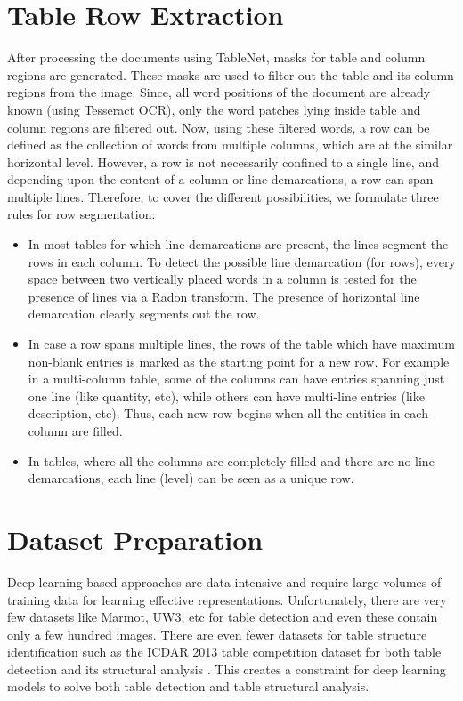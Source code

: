 \documentclass[conference]{IEEEtran}
\begin{document}
\section{Table Row Extraction}
\label{sec:Extraction}
After processing the documents using TableNet, masks for table and column regions are generated. These masks are used to filter out the table and its column regions from the image. Since, all word positions of the document are already known (using Tesseract OCR), only the word patches lying inside table and column regions are filtered out. Now, using these filtered words, a row can be defined as the collection of words from multiple columns, which are at the similar horizontal level. However, a row is not necessarily confined to a single line, and depending upon the content of a column or line demarcations, a row can span multiple lines. Therefore, to cover the different possibilities, we formulate three rules for row segmentation:
\begin{itemize}
\item In most tables for which line demarcations are present, the lines segment the rows in each column. To detect the possible line demarcation (for rows), every space between two vertically placed words in a column is tested for the presence of lines via a Radon transform. The presence of horizontal line demarcation clearly segments out the row.
\item In case a row spans multiple lines, the rows of the table which have maximum non-blank entries is marked as the starting point for a new row. For example in a multi-column table, some of the columns can have entries spanning just one line (like quantity, etc), while others can have multi-line entries (like description, etc). Thus, each new row begins when all the entities in each column are filled.
\item In tables, where all the columns are completely filled and there are no line demarcations, each line (level) can be seen as a unique row.
\end{itemize}

 
\section{Dataset Preparation}
\label{sec:datasets}
Deep-learning based approaches are data-intensive and require large volumes of training data for learning effective representations. Unfortunately, there are very few datasets like Marmot\cite{6195411}, UW3\cite{Guyon97datasets}, etc for table detection and even these contain only a few hundred images. There are even fewer datasets for table structure identification such as the ICDAR 2013 table competition dataset for both table detection and its structural analysis \cite{gobel2013icdar}. This creates a constraint for deep learning models to solve both table detection and table structural analysis.
\end{document}
